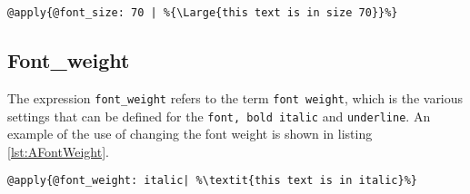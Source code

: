 \begin{lstlisting}[frame=single, caption=Changing font size, label=lst:AFontSize]
	@apply{@font_size: 70 | %{\Large{this text is in size 70}}%}
\end{lstlisting}

\subsection{Font\_weight}
The expression \texttt{font\_weight} refers to the term \texttt{font weight}, which is the various settings that can be defined for the \lstinline!font, bold italic! and \lstinline!underline!. An example of the use of changing the font weight is shown in listing \ref{lst:AFontWeight}.

\begin{lstlisting}[frame=single, caption=Changing font weight, label=lst:AFontWeight]
	@apply{@font_weight: italic| %\textit{this text is in italic}%}
\end{lstlisting}